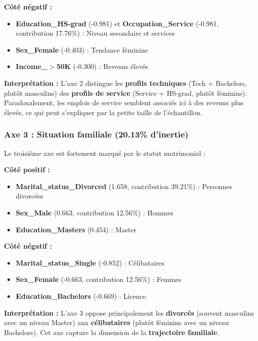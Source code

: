 \documentclass[12pt,a4paper]{article}
\begin{document}
\textbf{Côté négatif :}
\begin{itemize}
    \item \textbf{Education\_HS-grad} (-0.981) et \textbf{Occupation\_Service} (-0.981, contribution 17.76\%) : Niveau secondaire et services
    \item \textbf{Sex\_Female} (-0.403) : Tendance féminine
    \item \textbf{Income\_$>$50K} (-0.300) : Revenus élevés
\end{itemize}

\textbf{Interprétation :} L'axe 2 distingue les \textbf{profils techniques} (Tech + Bachelors, plutôt masculins) des \textbf{profils de service} (Service + HS-grad, plutôt féminins). Paradoxalement, les emplois de service semblent associés ici à des revenus plus élevés, ce qui peut s'expliquer par la petite taille de l'échantillon.

\subsubsection{Axe 3 : Situation familiale (20.13\% d'inertie)}

Le troisième axe est fortement marqué par le statut matrimonial :

\textbf{Côté positif :}
\begin{itemize}
    \item \textbf{Marital\_status\_Divorced} (1.658, contribution 39.21\%) : Personnes divorcées
    \item \textbf{Sex\_Male} (0.663, contribution 12.56\%) : Hommes
    \item \textbf{Education\_Masters} (0.454) : Master
\end{itemize}

\textbf{Côté négatif :}
\begin{itemize}
    \item \textbf{Marital\_status\_Single} (-0.852) : Célibataires
    \item \textbf{Sex\_Female} (-0.663, contribution 12.56\%) : Femmes
    \item \textbf{Education\_Bachelors} (-0.669) : Licence
\end{itemize}

\textbf{Interprétation :} L'axe 3 oppose principalement les \textbf{divorcés} (souvent masculins avec un niveau Master) aux \textbf{célibataires} (plutôt féminins avec un niveau Bachelors). Cet axe capture la dimension de la \textbf{trajectoire familiale}.
\end{document}
